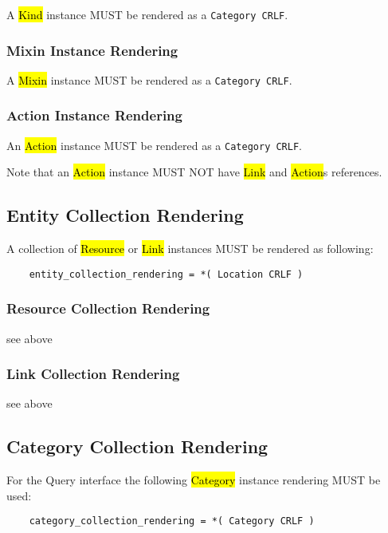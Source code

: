 \documentclass[10pt,a4paper]{article}
\begin{document}
A \hl{Kind} instance MUST be rendered as a {\tt Category CRLF}.

\subsubsection{Mixin Instance Rendering}
\label{sec:format_mixin}

A \hl{Mixin} instance MUST be rendered as a {\tt Category CRLF}.

\subsubsection{Action Instance Rendering}
\label{sec:format_action}

An \hl{Action} instance MUST be rendered as a {\tt Category CRLF}.

Note that an \hl{Action} instance MUST NOT have \hl{Link} and \hl{Action}s references.

\subsection{Entity Collection Rendering}

A collection of \hl{Resource} or \hl{Link} instances MUST be rendered as following:

\begin{verbatim}
	entity_collection_rendering = *( Location CRLF )
\end{verbatim}

\subsubsection{Resource Collection Rendering}

see above

\subsubsection{Link Collection Rendering}

see above

\subsection{Category Collection Rendering}

For the Query interface the following \hl{Category} instance rendering MUST be used:

\begin{verbatim}
	category_collection_rendering = *( Category CRLF )
\end{verbatim}
\end{document}

